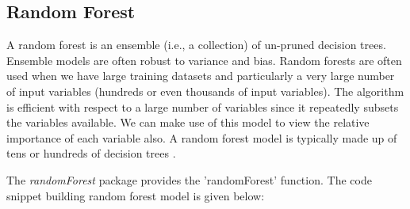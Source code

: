 \documentclass{article}\usepackage[]{graphicx}\usepackage[]{color}
\begin{document}
\subsection{Random Forest}\hspace{0.9cm} A random forest is an ensemble (i.e., a collection) of un-pruned
decision trees. Ensemble models are often robust to variance and bias. Random forests are often used when we have large training datasets and particularly a very large number of input variables (hundreds or even
thousands of input variables). The algorithm is efficient with respect to a large number of variables since it repeatedly subsets the variables available. We can make use of this model to view the relative importance of each variable also. A random forest model is typically made up of tens or hundreds of decision trees \cite{[5]}.\par

The \textit{randomForest} package provides the 'randomForest' function. The code snippet building random forest model is given below:
\end{document}
